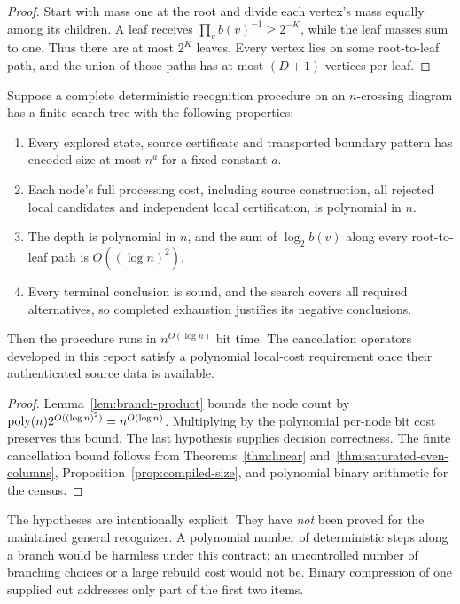 \begin{proof}
Start with mass one at the root and divide each vertex's mass equally
among its children. A leaf receives
$\prod_v b(v)^{-1}\ge2^{-K}$, while the leaf masses sum to one. Thus
there are at most $2^K$ leaves. Every vertex lies on some root-to-leaf
path, and the union of those paths has at most $(D+1)$ vertices per leaf.
\end{proof}

\begin{theorem}
\label{thm:global-contract}
Suppose a complete deterministic recognition procedure on an $n$-crossing
diagram has a finite search tree with the following properties:
\begin{enumerate}
\item Every explored state, source certificate and transported boundary
pattern has encoded size at most $n^a$ for a fixed constant $a$.
\item Each node's full processing cost, including source construction,
all rejected local candidates and independent local certification, is
polynomial in $n$.
\item The depth is polynomial in $n$, and the sum of $\log_2 b(v)$ along
every root-to-leaf path is $O((\log n)^2)$.
\item Every terminal conclusion is sound, and the search covers all
required alternatives, so completed exhaustion justifies its negative
conclusions.
\end{enumerate}
Then the procedure runs in $n^{O(\log n)}$ bit time. The cancellation
operators developed in this report satisfy a polynomial local-cost
requirement once their authenticated source data is available.
\end{theorem}

\begin{proof}
Lemma~\ref{lem:branch-product} bounds the node count by
$\operatorname{poly}(n)2^{O((\log n)^2)}=n^{O(\log n)}$. Multiplying by the
polynomial per-node bit cost preserves this bound. The last hypothesis
supplies decision correctness. The finite cancellation bound follows
from Theorems~\ref{thm:linear} and~\ref{thm:saturated-even-columns},
Proposition~\ref{prop:compiled-size}, and polynomial binary arithmetic
for the census.
\end{proof}

The hypotheses are intentionally explicit. They have \emph{not} been proved
for the maintained general recognizer. A polynomial number of deterministic
steps along a branch would be harmless under this contract; an uncontrolled
number of branching choices or a large rebuild cost would not be. Binary
compression of one supplied cut addresses only part of the first two items.

